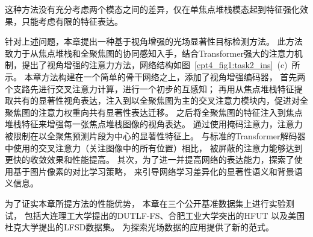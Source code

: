 %
%
这种方法没有充分考虑两个模态之间的差异，仅在单焦点堆栈模态起到特征强化效果，只能考虑有限的特征表达。
% 
% 
% 
% 
\par
%
%
针对上述问题，本章提出一种基于视角增强的光场显著性目标检测方法。
此方法致力于从焦点堆栈和全聚焦图的协同感知入手，结合Transformer强大的注意力机制，提出了视角增强的注意力方法，网络结构如图~\ref{cpt4_fig1:task2_ins}~(c)~所示。
本章方法构建在一个简单的骨干网络之上，添加了视角增强编码器，
首先两个支路先进行交叉注意力计算，进行一个初步的互感知；
再用从焦点堆栈特征提取共有的显著性视角表达，注入到以全聚焦图为主的交叉注意力模块内，促进对全聚焦图的注意力权重向共有显著性表达迁移。
之后将全聚焦图的特征注入到焦点堆栈特征来增强每一张焦点堆栈图像的视角表达。
通过使用掩码注意力，注意力被限制在以全聚焦预测片段为中心的显著性特征上。
与标准的Transformer解码器中使用的交叉注意力（关注图像中的所有位置）相比，
被屏蔽的注意力能够达到更快的收敛效果和性能提高。
其次，为了进一并提高网络的表达能力，探索了使用基于图片像素的对比学习策略，
来引导网络学习差异化的显著性语义和背景语义信息。










为了证实本章所提方法的性能优势，
本章在三个公开基准数据集上进行实验测试，
包括大连理工大学提出的DUTLF-FS、合肥工业大学突出的HFUT
以及美国杜克大学提出的LFSD数据集。
为探索光场数据的应用提供了新的范式。












% 
% 
% 
% 







